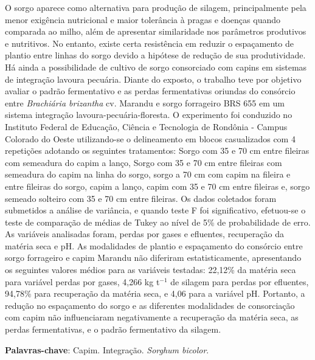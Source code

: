 \documentclass[article,12pt,onesidea,4paper,english,brazil]{abntex2}
\begin{document}
	\noindent O sorgo aparece como alternativa para produção de silagem, principalmente pela
	menor exigência nutricional e maior tolerância à pragas e doenças quando
	comparada ao milho, além de apresentar similaridade nos parâmetros produtivos e
	nutritivos. No entanto, existe certa resistência em reduzir o espaçamento de plantio
	entre linhas do sorgo devido a hipótese de redução de sua produtividade. Há ainda a
	possibilidade de cultivo de sorgo consorciado com capins em sistemas de integração
	lavoura pecuária. Diante do exposto, o trabalho teve por objetivo avaliar o padrão
	fermentativo e as perdas fermentativas oriundas do consórcio entre \textit{Brachiária
	brizantha} cv. Marandu e sorgo forrageiro BRS 655 em um sistema integração
	lavoura-pecuária-floresta. O experimento foi conduzido no Instituto Federal de
	Educação, Ciência e Tecnologia de Rondônia - Campus Colorado do Oeste
	utilizando-se o delineamento em blocos casualizados com 4 repetições adotando os
	seguintes tratamentos: Sorgo com 35 e 70 cm entre fileiras com semeadura do
	capim a lanço, Sorgo com 35 e 70 cm entre fileiras com semeadura do capim na
	linha do sorgo, sorgo a 70 cm com capim na fileira e entre fileiras do sorgo, capim a
	lanço, capim com 35 e 70 cm entre fileiras e, sorgo semeado solteiro com 35 e 70
	cm entre fileiras. Os dados coletados foram submetidos a análise de variância, e
	quando teste F foi significativo, efetuou-se o teste de comparação de médias de
	Tukey ao nível de 5\% de probabilidade de erro. As variáveis analisadas foram,
	perdas por gases e efluentes, recuperação da matéria seca e pH. As modalidades
	de plantio e espaçamento do consórcio entre sorgo forrageiro e capim Marandu não
	diferiram estatisticamente, apresentando os seguintes valores médios para as
	variáveis testadas: 22,12\% da matéria seca para variável perdas por gases, 4,266 kg
	t$^{-1}$ de silagem para perdas por efluentes, 94,78\% para recuperação da matéria seca,
	e 4,06 para a variável pH. Portanto, a redução no espaçamento do sorgo e as
	diferentes modalidades de consorciação com capim não influenciaram
	negativamente a recuperação da matéria seca, as perdas fermentativas, e o padrão
	fermentativo da silagem.
	
	\vspace{\onelineskip}
	
	\noindent
	\textbf{Palavras-chave}: Capim. Integração. \textit{Sorghum bicolor}.
	
\end{document}
